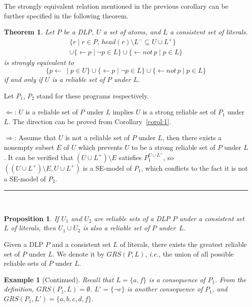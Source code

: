 \documentclass{article}
\makeatletter
\newtheorem{theorem}{Theorem}
\newtheorem{proposition}{Proposition}
\newtheorem{example}{Example}
\newenvironment{proofs}{{\bf Proof Sketch:}}{\rule{2mm}{2mm}\\[-.5em] }
\newcommand\ie{{\it i.e.\@}}
\newcommand{\Not}{not \,}
\newcommand{\GRS}{G\!R\!S}
\makeatother
\begin{document}
The strongly equivalent relation mentioned in the previous corollary can be further specified in the following theorem.
\begin{theorem}
  Let $P$ be a DLP, $U$ a set of atoms, and $L$ a consistent set of literals.
  \begin{multline*}
  \{ r\mid r\in P,\, head(r)\setminus L^-\subseteq U\cup L^+\}\\\cup \{ \gets p\mid \neg p\in L\}\cup \{\gets \Not p\mid p\in L\}
  \end{multline*}
  is strongly equivalent to
  \[
  \{ p\gets\ \mid p\in U\}\cup \{ \gets p\mid \neg p\in L\}\cup \{\gets\Not p\mid p\in L\}
  \]
  if and only if $U$ is a reliable set of $P$ under $L$.
\end{theorem}
\begin{proofs}
Let $P_1$, $P_2$ stand for these programs respectively.

$\Leftarrow$: $U$ is a reliable set of $P$ under $L$ implies $U$ is a strong reliable set of $P_1$ under $L$.
The direction can be proved from Corollary~\ref{corol:1}.

$\Rightarrow$:
Assume that $U$ is not a reliable set of $P$ under $L$, then there exists a nonempty subset $E$ of $U$ which prevents $U$ to be a strong reliable set of $P$ under $L$.
It can be verified that $(U\cup L^+) \setminus E$ satisfies $P_1^{U\cup L^+}$, so $((U\cup L^+) \setminus E, U\cup L^+)$ is a SE-model of $P_1$, which conflicts to the fact it is not a SE-model of $P_2$.
\end{proofs}


\begin{proposition}
  If $U_1$ and $U_2$ are reliable sets of a DLP $P$ under a consistent set $L$ of literals, then $U_1\cup U_2$ is also a reliable set of $P$ under~$L$.
\end{proposition}
Given a DLP $P$ and a consistent set $L$ of literals, there exists the greatest  reliable set of $P$ under $L$.
We denote it by $\GRS(P, L)$, \ie, the union of all possible  reliable sets of $P$ under $L$.


\setcounter{example}{0}
\begin{example}[Continued]
Recall that $L = \{a, f\}$ is a consequence of $P_1$. From the definition, $\GRS(P_1, L) = \emptyset$.
$L' = \{\neg e\}$ is another consequence of $P_1$, and $\GRS(P_1, L') = \{ a, b, c, d, f\}$.
\end{example}
\end{document}
